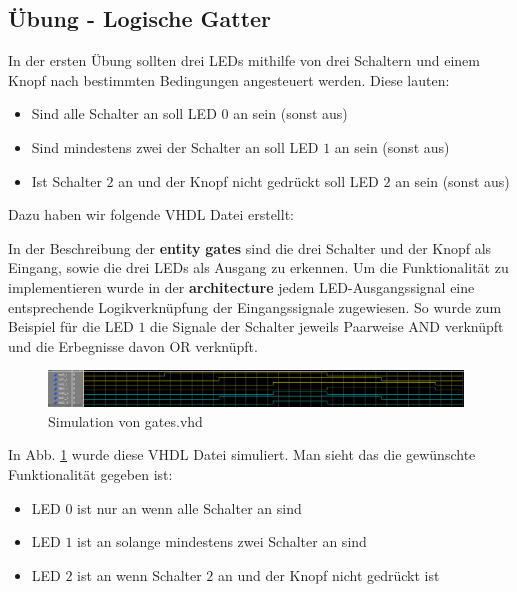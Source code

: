 \subsection{Übung - Logische Gatter}

In der ersten Übung sollten drei LEDs mithilfe von drei Schaltern und einem Knopf nach bestimmten Bedingungen angesteuert werden. Diese lauten:
\begin{itemize}
    \item Sind alle Schalter an soll LED $0$ an sein (sonst aus)
    \item Sind mindestens zwei der Schalter an soll LED $1$ an sein (sonst aus)
    \item Ist Schalter $2$ an und der Knopf nicht gedrückt soll LED $2$ an sein (sonst aus)
\end{itemize}

Dazu haben wir folgende VHDL Datei erstellt:



In der Beschreibung der \textbf{entity} \textbf{gates} sind die drei Schalter und der Knopf als Eingang, sowie die drei LEDs als Ausgang zu erkennen.
Um die Funktionalität zu implementieren wurde in der \textbf{architecture} jedem LED-Ausgangssignal eine entsprechende Logikverknüpfung der Eingangssignale zugewiesen.
So wurde zum Beispiel für die LED $1$ die Signale der Schalter jeweils Paarweise AND verknüpft und die Erbegnisse davon OR verknüpft.

\begin{figure}[ht]
	\centering
    \includegraphics[width=0.98\textwidth]{../Daten/gates.png}
	\caption{Simulation von gates.vhd}
	\label{img_gates}
\end{figure}

In Abb. \ref{img_gates} wurde diese VHDL Datei simuliert.
Man sieht das die gewünschte Funktionalität gegeben ist:
\begin{itemize}
    \item LED $0$ ist nur an wenn alle Schalter an sind
    \item LED $1$ ist an solange mindestens zwei Schalter an sind
    \item LED $2$ ist an wenn Schalter $2$ an und der Knopf nicht gedrückt ist
\end{itemize}

